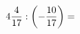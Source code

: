 \documentclass[preview]{standalone}
\begin{document}
\begin{align*}
4 { 4 \over 17 }  :  \left( - { 10 \over 17 } \right)  =
\end{align*}
\end{document}
